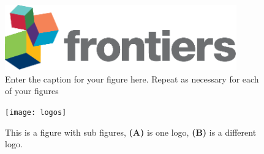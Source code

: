 \documentclass[utf8]{frontiersSCNS} %
\begin{document}
\begin{figure}[h!]
\begin{center}
\includegraphics[width=10cm]{logo1}%
\end{center}
\caption{ Enter the caption for your figure here.  Repeat as  necessary for each of your figures}\label{fig:1}
\end{figure}


\begin{figure}[h!]
\begin{center}
\texttt{[image: logos]}
\end{center}
\caption{This is a figure with sub figures, \textbf{(A)} is one logo, \textbf{(B)} is a different logo.}\label{fig:2}
\end{figure}

\end{document}
